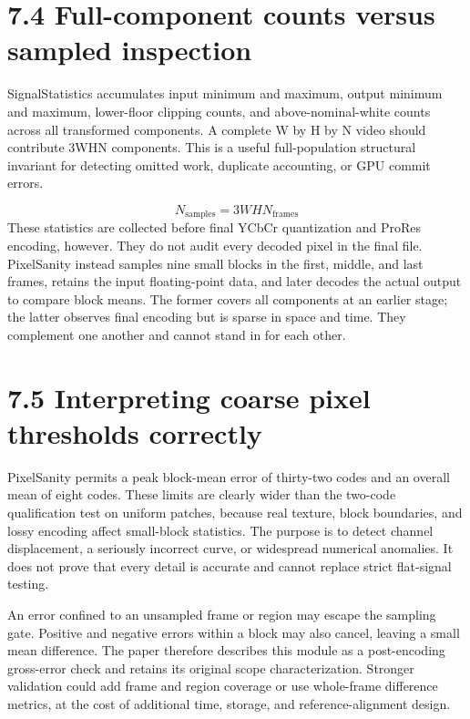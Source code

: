 \documentclass[11pt,a4paper,openany]{book}
\begin{document}
\section*{7.4 Full-component counts versus sampled inspection}
SignalStatistics accumulates input minimum and maximum, output minimum and maximum, lower-floor clipping counts, and above-nominal-white counts across all transformed components. A complete W by H by N video should contribute 3WHN components. This is a useful full-population structural invariant for detecting omitted work, duplicate accounting, or GPU commit errors.


\begin{equation}
N_{\mathrm{samples}}=3WHN_{\mathrm{frames}}
\end{equation}
These statistics are collected before final YCbCr quantization and ProRes encoding, however. They do not audit every decoded pixel in the final file. PixelSanity instead samples nine small blocks in the first, middle, and last frames, retains the input floating-point data, and later decodes the actual output to compare block means. The former covers all components at an earlier stage; the latter observes final encoding but is sparse in space and time. They complement one another and cannot stand in for each other.


\section*{7.5 Interpreting coarse pixel thresholds correctly}
PixelSanity permits a peak block-mean error of thirty-two codes and an overall mean of eight codes. These limits are clearly wider than the two-code qualification test on uniform patches, because real texture, block boundaries, and lossy encoding affect small-block statistics. The purpose is to detect channel displacement, a seriously incorrect curve, or widespread numerical anomalies. It does not prove that every detail is accurate and cannot replace strict flat-signal testing.

An error confined to an unsampled frame or region may escape the sampling gate. Positive and negative errors within a block may also cancel, leaving a small mean difference. The paper therefore describes this module as a post-encoding gross-error check and retains its original scope characterization. Stronger validation could add frame and region coverage or use whole-frame difference metrics, at the cost of additional time, storage, and reference-alignment design.
\end{document}
